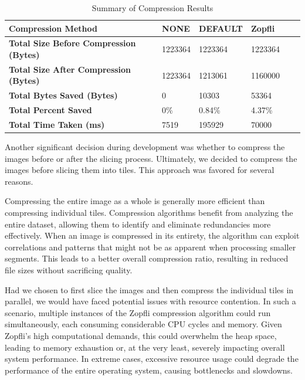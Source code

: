 \begin{table}[h]
    \centering
    \begin{tabular}{|p{7cm}|p{2.1cm}|p{2.1cm}|p{2.1cm}|p{2.1cm}|p{2.1cm}|}
        \hline
        \textbf{Compression Method} & \textbf{NONE} & \textbf{DEFAULT} & \textbf{Zopfli} \\ \hline
        \textbf{Total Size Before Compression (Bytes)} & 1223364 & 1223364 & 1223364 \\ \hline
        \textbf{Total Size After Compression (Bytes)} & 1223364 & 1213061 & 1160000 \\ \hline
        \textbf{Total Bytes Saved (Bytes)} & 0 & 10303 & 53364 \\ \hline
        \textbf{Total Percent Saved} & 0\% & 0.84\% & 4.37\% \\ \hline
        \textbf{Total Time Taken (ms)} & 7519 & 195929 & 70000 \\ \hline
    \end{tabular}
    \caption{Summary of Compression Results}
    \label{tab:summary_compression}
\end{table}

Another significant decision during development was whether to compress the images before or after the slicing process. Ultimately, we decided to compress the images before slicing them into tiles. This approach was favored for several reasons.

Compressing the entire image as a whole is generally more efficient than compressing individual tiles. Compression algorithms benefit from analyzing the entire dataset, allowing them to identify and eliminate redundancies more effectively. When an image is compressed in its entirety, the algorithm can exploit correlations and patterns that might not be as apparent when processing smaller segments. This leads to a better overall compression ratio, resulting in reduced file sizes without sacrificing quality.

Had we chosen to first slice the images and then compress the individual tiles in parallel, we would have faced potential issues with resource contention. In such a scenario, multiple instances of the Zopfli compression algorithm could run simultaneously, each consuming considerable CPU cycles and memory. Given Zopfli’s high computational demands, this could overwhelm the heap space, leading to memory exhaustion or, at the very least, severely impacting overall system performance. In extreme cases, excessive resource usage could degrade the performance of the entire operating system, causing bottlenecks and slowdowns.

